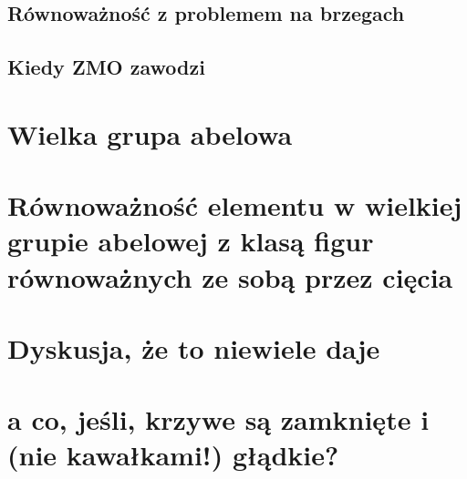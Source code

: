 \documentclass[a4paper, 12pt]{article}
\begin{document}
\subsection{Równoważność z problemem na brzegach}

\subsection{Kiedy ZMO zawodzi}

\section{Wielka grupa abelowa}

\section{Równoważność elementu w wielkiej grupie abelowej z klasą figur równoważnych ze sobą przez cięcia}

\section{Dyskusja, że to niewiele daje}

\section{a co, jeśli, krzywe są zamknięte i (nie kawałkami!) głądkie?}
\end{document}
